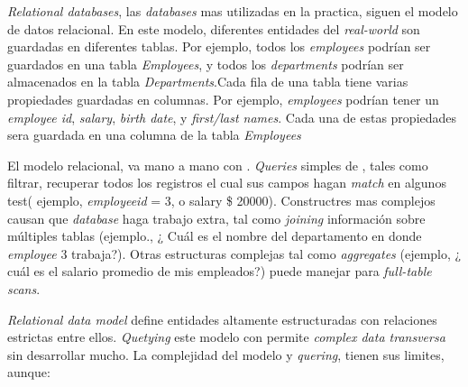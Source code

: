 \textit{Relational databases}, las \textit{databases} mas utilizadas en la practica, siguen el modelo de datos relacional. En este modelo, diferentes entidades del \textit{real-world} son guardadas en diferentes tablas. Por ejemplo, todos los \textit{employees} podrían ser guardados en una tabla \textit{Employees}, y todos los \textit{departments} podrían ser almacenados en la tabla \textit{Departments}.Cada fila de una tabla tiene varias propiedades guardadas en columnas. Por ejemplo, \textit{employees} podrían tener un \textit{employee id}, \textit{salary}, \textit{birth date}, y \textit{first/last names}. Cada una de estas propiedades sera guardada en una columna de la tabla \textit{Employees}


El modelo relacional, va mano a mano con . \textit{Queries} simples de , tales como filtrar, recuperar todos los registros el cual sus campos hagan \textit{match} en algunos test( ejemplo, \textit{employeeid} = 3, o salary \> \$ 20000). Constructres mas complejos causan que \textit{database} haga trabajo extra, tal como \textit{joining} información sobre múltiples tablas (ejemplo., ¿ Cuál es el nombre del departamento en donde \textit{employee} 3 trabaja?). Otras estructuras complejas tal como \textit{aggregates} (ejemplo, ¿ cuál es el salario promedio de mis empleados?) puede manejar para \textit{full-table scans}.


\textit{Relational data model} define entidades altamente estructuradas con relaciones estrictas entre ellos. \textit{Quetying} este modelo con  permite \textit{complex data transversa} sin desarrollar mucho. La complejidad del modelo y \textit{quering}, tienen sus limites, aunque:

